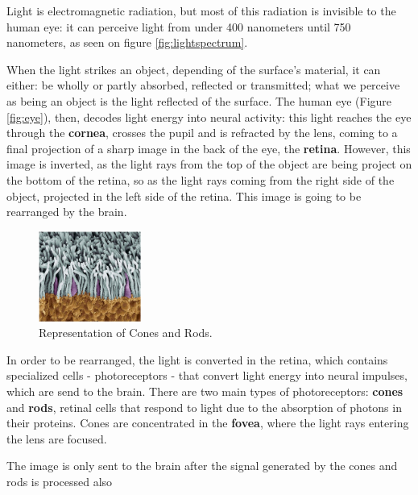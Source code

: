 \documentclass{report}
\begin{document}
%
Light is electromagnetic radiation, but most of this radiation is invisible to the human eye: it can
perceive light from under 400 nanometers until 750 nanometers, as seen on figure \ref{fig:lightspectrum}. \par
When the light strikes an object, depending of the surface’s material, it can either: be wholly or partly
absorbed, reflected or transmitted; what we perceive as being an object is the light reflected of the
surface. The human eye (Figure \ref{fig:eye}), then, decodes light energy into neural activity:
this light reaches the eye through the \textbf{cornea}, crosses the pupil and is refracted by the lens, coming to a final
projection of a sharp image in the back of the eye, the \textbf{retina}. However, this image is
inverted, as the light rays from the top of the object are being project on the bottom of the retina,
so as the light rays coming from the right side of the object, projected in the left side of the
retina. This image is going to be rearranged by the brain.  \par
%
\begin{figure}
	\centering
    \vspace{-\baselineskip}
	\includegraphics[width=0.3\textwidth]{Eye_ConesRods.png}
    \caption[Cones and Rods]{Representation of Cones and Rods.\protect\footnotemark{}}
    \label{fig:conesrods}
\end{figure}
%
In order to be rearranged, the light is converted in the retina, which contains specialized cells
- photoreceptors - that convert light energy into neural impulses,
which are send to the brain. There are two main types of photoreceptors: \textbf{cones} and
\textbf{rods},
retinal cells that respond to light due to the absorption of photons in their proteins. Cones are concentrated in the \textbf{fovea}, where the light rays
entering the lens are focused. \par
The image is only sent to the brain after the signal generated by the cones and rods is processed also
\end{document}
